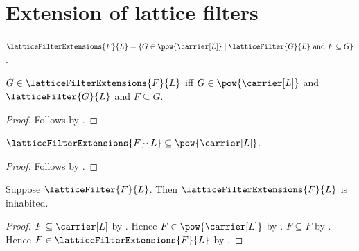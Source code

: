 \section{Extension of lattice filters}




\begin{definition}\label{lattice_filter_extensions}
    $\latticeFilterExtensions{F}{L}=
        \{G\in\pow{\carrier[L]}\mid
            \text{$\latticeFilter{G}{L}$ and $F\subseteq G$}\}$.
\end{definition}

\begin{proposition}\label{lattice_filter_extensions_iff}
    $G\in\latticeFilterExtensions{F}{L}$ iff
        $G\in\pow{\carrier[L]}$ and
        $\latticeFilter{G}{L}$ and $F\subseteq G$.
\end{proposition}
\begin{proof}
    Follows by .
\end{proof}

\begin{proposition}\label{lattice_filter_extensions_subseteq_powerset}
    $\latticeFilterExtensions{F}{L}
        \subseteq\pow{\carrier[L]}$.
\end{proposition}
\begin{proof}
    Follows by
        .
\end{proof}

\begin{proposition}\label{lattice_filter_extensions_inhabited}
    Suppose $\latticeFilter{F}{L}$.
    Then $\latticeFilterExtensions{F}{L}$ is inhabited.
\end{proposition}
\begin{proof}
    $F\subseteq\carrier[L]$ by
        .
    Hence $F\in\pow{\carrier[L]}$ by .
    $F\subseteq F$ by .
    Hence $F\in\latticeFilterExtensions{F}{L}$ by
        .
\end{proof}

